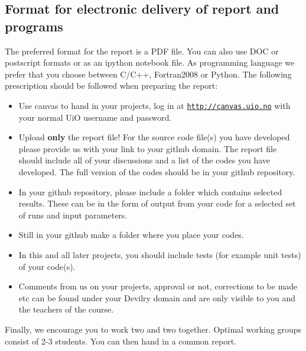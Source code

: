 \documentclass[%
oneside,                 %
final,                   %
10pt]{article}
\begin{document}
\noindent
\subsection{Format for electronic delivery of report and programs}

The preferred format for the report is a PDF file. You can also use DOC or postscript formats or as an ipython notebook file.  As programming language we prefer that you choose between C/C++, Fortran2008 or Python. The following prescription should be followed when preparing the report:

\begin{itemize}
  \item Use canvas to hand in your projects, log in  at  \href{{http://canvas.uio.no}}{\nolinkurl{http://canvas.uio.no}} with your normal UiO username and password.

  \item Upload \textbf{only} the report file!  For the source code file(s) you have developed please provide us with your link to your github domain.  The report file should include all of your discussions and a list of the codes you have developed.  The full version of the codes should be in your github repository.

  \item In your github repository, please include a folder which contains selected results. These can be in the form of output from your code for a selected set of runs and input parameters.

  \item Still in your github make a folder where you place your codes. 

  \item In this and all later projects, you should include tests (for example unit tests) of your code(s).

  \item Comments  from us on your projects, approval or not, corrections to be made  etc can be found under your Devilry domain and are only visible to you and the teachers of the course.
\end{itemize}

\noindent
Finally, 
we encourage you to work two and two together. Optimal working groups consist of 
2-3 students. You can then hand in a common report. 



\end{document}
